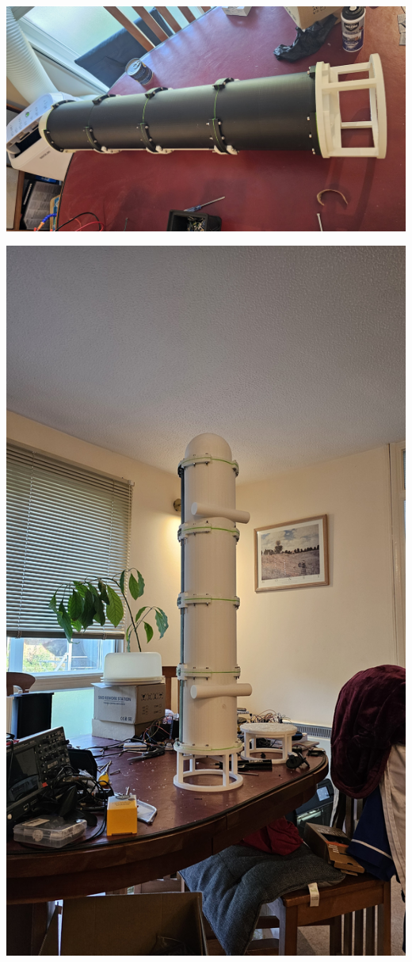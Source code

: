 \documentclass[11pt,a4paper,titlepage]{report}
\begin{document}
	\begin{center}
		\label{picture:images_hull_2}
		\includegraphics[width=\linewidth]{assets/AUV_Hull2.jpg}
	\end{center}
	\begin{center}
		\label{picture:images_hull_3}
		\includegraphics[width=\linewidth]{assets/AUV_Hull3.jpg}
	\end{center}
	
\end{document}
